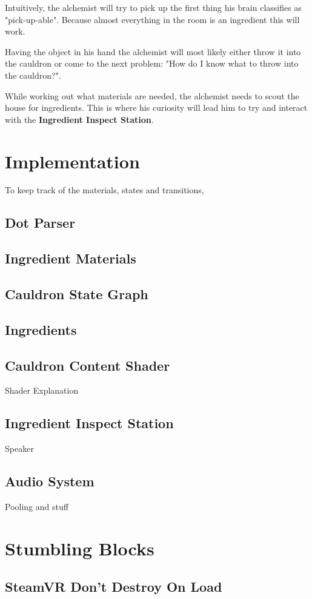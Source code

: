 \documentclass{vgtc}
\begin{document}
Intuitively, the alchemist will try to pick up the first thing his brain classifies as "pick-up-able". Because
almost everything in the room is an ingredient this will work.

Having the object in his hand the alchemist will most likely either throw it into the cauldron or come to the next
problem: "How do I know what to throw into the cauldron?".

While working out what materials are needed, the alchemist needs to scout the house for ingredients. This is where
his curiosity will lead him to try and interact with the \textbf{Ingredient Inspect Station}.

\section{Implementation}

To keep track of the materials, states and transitions, 

\subsection{Dot Parser}

\subsection{Ingredient Materials}

\subsection{Cauldron State Graph}

\subsection{Ingredients}

\subsection{Cauldron Content Shader}

Shader Explanation

\subsection{Ingredient Inspect Station}

Speaker

\subsection{Audio System}

Pooling and stuff

\section{Stumbling Blocks}

\subsection{SteamVR Don't Destroy On Load}

\end{document}

